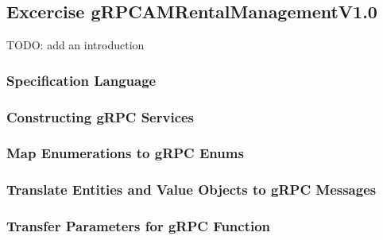 \subsection{Excercise gRPCAMRentalManagementV1.0}
TODO: add an introduction

\subsubsection*{Specification Language}

\subsubsection*{Constructing gRPC Services}

\subsubsection*{Map Enumerations to gRPC Enums}

\subsubsection*{Translate Entities and Value Objects to gRPC Messages}

\subsubsection*{Transfer Parameters for gRPC Function}